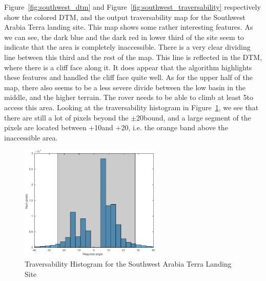 \documentclass[12pt]{article}
\begin{document}
\par Figure~\ref{fig:southwest_dtm} and Figure~\ref{fig:southwest_traversability} respectively show the colored DTM, and the output traversability map for the Southwest Arabia Terra landing site. This map shows some rather interesting features. As we can see, the dark blue and the dark red in lower third of the site seem to indicate that the area is completely inaccessible. There is a very clear dividing line between this third and the rest of the map. This line is reflected in the DTM, where there is a cliff face along it. It does appear that the algorithm highlights these features and handled the cliff face quite well. As for the upper half of the map, there also seems to be a less severe divide between the low basin in the middle, and the higher terrain. The rover needs to be able to climb at least 5\textdegree to access this area. Looking at the traversability histogram in Figure~\ref{fig:southwest_hist}, we see that there are still a lot of pixels beyond the $\pm$20\textdegree bound, and a large segment of the pixels are located between +10\textdegree and +20\textdegree, i.e. the orange band above the inaccessible area.
\begin{figure}[h!]
  \centering
  \includegraphics[width=0.6\textwidth]{figures/maps/ESP_011844_1855/DTEEC_011844_1855_002812_1855_A01-hist.pdf}
  \caption{Traversability Histogram for the Southwest Arabia Terra Landing Site}
  \label{fig:southwest_hist}
\end{figure}
\end{document}

